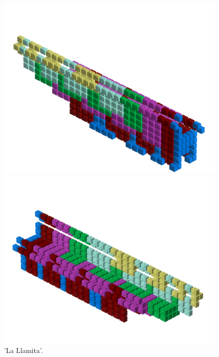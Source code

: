 \begin{figure}[H]
    \centering
    \begin{adjustbox}{width=13cm,center}
      \includegraphics[width=12cm]{src/patterns/pattern2-45.png}%
    \end{adjustbox}
    \begin{adjustbox}{width=13cm,margin=0cm -4cm}
      \includegraphics[width=12cm]{src/patterns/pattern2-225.png}%
    \end{adjustbox}
\caption{'La Llamita'.}
\end{figure}
\clearpage

